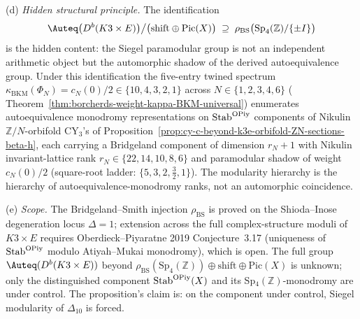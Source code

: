 \begin{remark}
\textup{(d)} \emph{Hidden structural principle.} The identification
\[
 \Auteq\bigl(D^b(K3\times E)\bigr)\big/\bigl(\mathrm{shift}\oplus\mathrm{Pic}(X)\bigr)
 \;\supseteq\; \rho_{\mathrm{BS}}\bigl(\mathrm{Sp}_4(\mathbb Z)/\{\pm I\}\bigr)
\]
is the hidden content: the Siegel paramodular group is not an
independent arithmetic object but the automorphic shadow of the
derived autoequivalence group. Under this identification the
five-entry twined spectrum
$\kappa_{\mathrm{BKM}}(\Phi_N)=c_N(0)/2\in\{10,4,3,2,1\}$ across
$N\in\{1,2,3,4,6\}$
(\cite{VolI}
Theorem~\ref{thm:borcherds-weight-kappa-BKM-universal}) enumerates
autoequivalence monodromy representations on $\mathrm{Stab}^{\mathrm{OPiy}}$
components of Nikulin $\mathbb Z/N$-orbifold CY$_3$'s of
Proposition~\ref{prop:cy-c-beyond-k3e-orbifold-ZN-sections-beta-h},
each carrying a Bridgeland component of dimension $r_N+1$ with
Nikulin invariant-lattice rank $r_N\in\{22,14,10,8,6\}$ and
paramodular shadow of weight $c_N(0)/2$ (square-root ladder:
$\{5, 3, 2, \tfrac32, 1\}$). The modularity hierarchy is the
hierarchy of autoequivalence-monodromy ranks,
not an automorphic coincidence.

\textup{(e)} \emph{Scope.} The Bridgeland--Smith injection
$\rho_{\mathrm{BS}}$ is proved on the Shioda--Inose degeneration locus
$\Delta=1$; extension across the full complex-structure moduli of
$K3\times E$ requires Oberdieck--Piyaratne 2019 Conjecture~3.17
(uniqueness of $\mathrm{Stab}^{\mathrm{OPiy}}$ modulo Atiyah--Mukai monodromy),
which is open. The full group $\Auteq(D^b(K3\times E))$ beyond
$\rho_{\mathrm{BS}}(\mathrm{Sp}_4(\mathbb Z))\oplus\mathrm{shift}
\oplus\mathrm{Pic}(X)$ is unknown; only the distinguished component
$\mathrm{Stab}^{\mathrm{OPiy}}(X)$ and its Sp$_4(\mathbb Z)$-monodromy are
under control. The proposition's claim is: on the component under
control, Siegel modularity of $\Delta_{10}$ is forced.


\end{remark}
